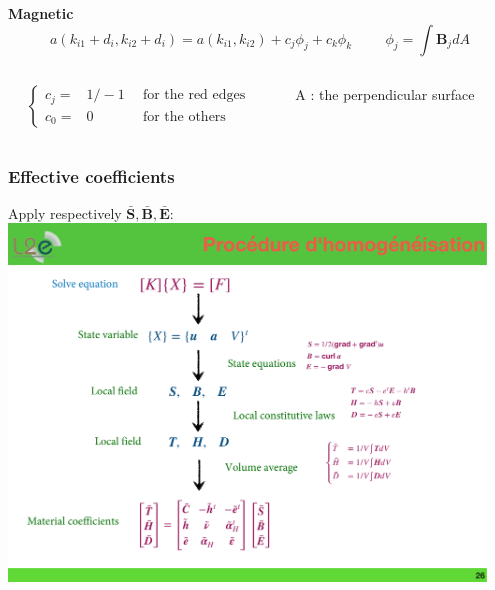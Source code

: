 \documentclass[compress]{beamer}
\begin{document}
\begin{frame}
\vspace*{0.5\baselineskip}
\textbf{Magnetic}\vspace*{-\baselineskip}
\begin{equation*}
a(k_{i1}+d_i,k_{i2}+d_i) = a(k_{i1},k_{i2})+ c_j \phi_j + c_k\phi_k \hspace{1cm} \phi_j = \int \boldsymbol{B}_jdA
\end{equation*}
\begin{columns}[totalwidth=\textwidth]
   \begin{column}{.65\textwidth}\vspace*{-\baselineskip}
	\begin{equation*} 
				\left\{ 
				\begin{aligned}
				c_j = & 1/-1 & \enspace \text{for the red edges } \\
				c_0 = & 0 & \enspace \text{for the others }
        		\end{aligned}
				\right.
	\end{equation*}
	\end{column}
	\begin{column}{.30\textwidth}
	A : the perpendicular surface
	\end{column}
\end{columns}
\end{frame}

\begin{frame}\frametitle{Effective coefficients}
Apply respectively $\boldsymbol{\bar{S}}, \boldsymbol{\bar{B}}, \boldsymbol{\bar{E}}$:
\includegraphics[width=0.95\textwidth]{Graphic/04_homoprocedure.pdf}
\end{frame}
\end{document}
